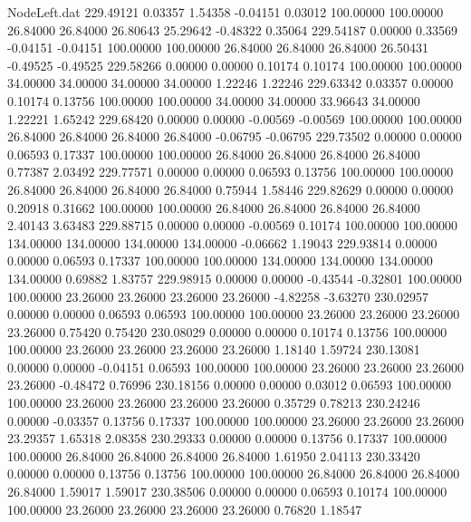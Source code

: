 \begin{filecontents}{NodeLeft.dat}
 229.49121    0.03357    1.54358    -0.04151    0.03012  100.00000  100.00000   26.84000   26.84000   26.80643   25.29642   -0.48322    0.35064
 229.54187    0.00000    0.33569    -0.04151   -0.04151  100.00000  100.00000   26.84000   26.84000   26.84000   26.50431   -0.49525   -0.49525
 229.58266    0.00000    0.00000     0.10174    0.10174  100.00000  100.00000   34.00000   34.00000   34.00000   34.00000    1.22246    1.22246
 229.63342    0.03357    0.00000     0.10174    0.13756  100.00000  100.00000   34.00000   34.00000   33.96643   34.00000    1.22221    1.65242
 229.68420    0.00000    0.00000    -0.00569   -0.00569  100.00000  100.00000   26.84000   26.84000   26.84000   26.84000   -0.06795   -0.06795
 229.73502    0.00000    0.00000     0.06593    0.17337  100.00000  100.00000   26.84000   26.84000   26.84000   26.84000    0.77387    2.03492
 229.77571    0.00000    0.00000     0.06593    0.13756  100.00000  100.00000   26.84000   26.84000   26.84000   26.84000    0.75944    1.58446
 229.82629    0.00000    0.00000     0.20918    0.31662  100.00000  100.00000   26.84000   26.84000   26.84000   26.84000    2.40143    3.63483
 229.88715    0.00000    0.00000    -0.00569    0.10174  100.00000  100.00000  134.00000  134.00000  134.00000  134.00000   -0.06662    1.19043
 229.93814    0.00000    0.00000     0.06593    0.17337  100.00000  100.00000  134.00000  134.00000  134.00000  134.00000    0.69882    1.83757
 229.98915    0.00000    0.00000    -0.43544   -0.32801  100.00000  100.00000   23.26000   23.26000   23.26000   23.26000   -4.82258   -3.63270
 230.02957    0.00000    0.00000     0.06593    0.06593  100.00000  100.00000   23.26000   23.26000   23.26000   23.26000    0.75420    0.75420
 230.08029    0.00000    0.00000     0.10174    0.13756  100.00000  100.00000   23.26000   23.26000   23.26000   23.26000    1.18140    1.59724
 230.13081    0.00000    0.00000    -0.04151    0.06593  100.00000  100.00000   23.26000   23.26000   23.26000   23.26000   -0.48472    0.76996
 230.18156    0.00000    0.00000     0.03012    0.06593  100.00000  100.00000   23.26000   23.26000   23.26000   23.26000    0.35729    0.78213
 230.24246    0.00000   -0.03357     0.13756    0.17337  100.00000  100.00000   23.26000   23.26000   23.26000   23.29357    1.65318    2.08358
 230.29333    0.00000    0.00000     0.13756    0.17337  100.00000  100.00000   26.84000   26.84000   26.84000   26.84000    1.61950    2.04113
 230.33420    0.00000    0.00000     0.13756    0.13756  100.00000  100.00000   26.84000   26.84000   26.84000   26.84000    1.59017    1.59017
 230.38506    0.00000    0.00000     0.06593    0.10174  100.00000  100.00000   23.26000   23.26000   23.26000   23.26000    0.76820    1.18547

\end{filecontents}
